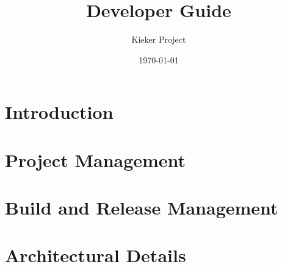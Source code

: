 \documentclass[a4paper, oneside, 11pt, pointlessnumbers, headsepline]{scrbook}
\title{%
\Huge\Kieker{} Developer Guide%
}
\author{\sffamily Kieker Project}
\date{\sffamily\today}
\begin{document}
  \maketitle
  \tableofcontents

\chapter{Introduction}


\chapter{Project Management}


\chapter{Build and Release Management}


\chapter{Architectural Details}

\end{document}
